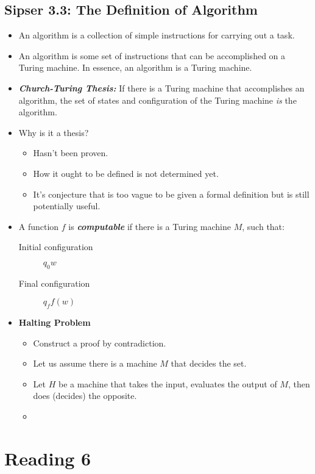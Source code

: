 \documentclass{article}
\begin{document}
\subsection{Sipser 3.3: The Definition of Algorithm}
\begin{itemize}
    \item An algorithm is a collection of simple instructions for carrying out a task.
    \item An algorithm is some set of instructions that can be accomplished on a Turing machine. In essence, an algorithm is a Turing machine.
    \item \textbf{\textit{Church-Turing Thesis:}} If there is a Turing machine that accomplishes an algorithm, the set of states and configuration of the Turing machine \textit{is} the algorithm.
    \item Why is it a thesis?
    \begin{itemize}
        \item Hasn't been proven.
        \item How it ought to be defined is not determined yet.
        \item It's conjecture that is too vague to be given a formal definition but is still potentially useful.
    \end{itemize}
    \item A function $f$ is \textbf{\textit{computable}} if there is a Turing machine $M$, such that:
    \begin{description}
        \item[Initial configuration] $q_0 w$
        \item[Final configuration] $q_f f(w)$  
    \end{description}
    \item \textbf{Halting Problem}
    \begin{itemize}
        \item Construct a proof by contradiction.
        \item Let us assume there is a machine $M$ that decides the set.
        \item Let $H$ be a machine that takes the input, evaluates the output of $M$, then does (decides) the opposite.
        \item 
    \end{itemize}
\end{itemize}

\section{Reading 6}
\end{document}
